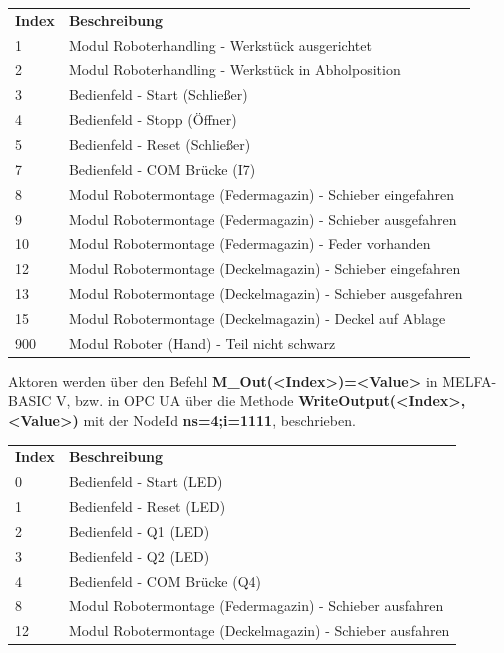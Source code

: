 \documentclass[11pt,a4paper,ngerman]{article}
\begin{document}
\begin{center}
	\setlength\extrarowheight{4pt}
	\small
	\begin{tabularx}{\textwidth}{|p{4cm}|X|}
		\hline
		\rowcolor{tublau}
		\multicolumn{2}{|c|}{\bf \color{white} \large Sensoren}\\
		\hline\hline
		\rowcolor{gray!80}
		\bf Index & \bf Beschreibung\\
		\hline\hline
		1 & Modul Roboterhandling - Werkstück ausgerichtet\\
		2 & Modul Roboterhandling - Werkstück in Abholposition\\
		3 & Bedienfeld - Start (Schließer)\\
		4 & Bedienfeld - Stopp (Öffner) \\
		5 & Bedienfeld - Reset (Schließer)\\
		7 & Bedienfeld - COM Brücke (I7)\\
		8 & Modul Robotermontage (Federmagazin) - Schieber eingefahren\\
		9 & Modul Robotermontage (Federmagazin) - Schieber ausgefahren\\
		10 & Modul Robotermontage (Federmagazin) - Feder vorhanden \\
		12 & Modul Robotermontage (Deckelmagazin) - Schieber eingefahren\\
		13 & Modul Robotermontage (Deckelmagazin) - Schieber ausgefahren\\
		15 & Modul Robotermontage (Deckelmagazin) - Deckel auf Ablage\\
		900 & Modul Roboter (Hand) - Teil nicht schwarz\\
		\hline
	\end{tabularx}
\end{center}
Aktoren werden über den Befehl \textbf{M\_Out(<Index>)=<Value>} in MELFA-BASIC V, bzw. in OPC UA über die Methode \textbf{WriteOutput(<Index>,<Value>)} mit der NodeId \textbf{ns=4;i=1111}, beschrieben.
\begin{center}
	\setlength\extrarowheight{4pt}
	\small
	\begin{tabularx}{\textwidth}{|p{4cm}|X|}
		\hline
		\rowcolor{tublau}
		\multicolumn{2}{|c|}{\bf \color{white} \large Aktoren}\\
		\hline\hline
		\rowcolor{gray!80}
		\bf Index & \bf Beschreibung\\
		\hline\hline
		0 & Bedienfeld - Start (LED)\\
		1 & Bedienfeld - Reset (LED)\\
		2 & Bedienfeld - Q1 (LED)\\
		3 & Bedienfeld - Q2 (LED)\\
		4 & Bedienfeld - COM Brücke (Q4)\\
		8 & Modul Robotermontage (Federmagazin) - Schieber ausfahren\\
		12 & Modul Robotermontage (Deckelmagazin) - Schieber ausfahren\\
		\hline
	\end{tabularx}
\end{center}
\end{document}
